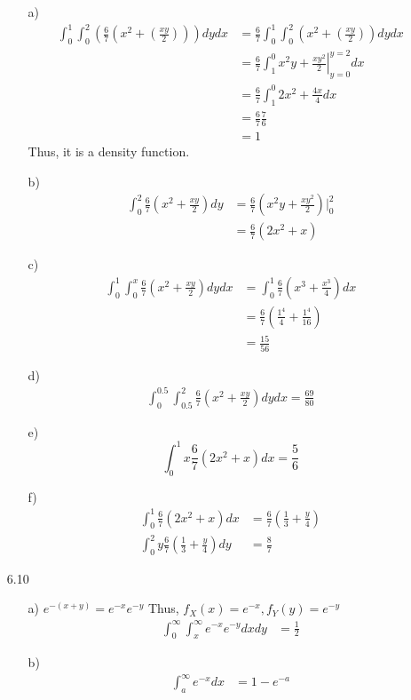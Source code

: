 \documentclass{article}
\begin{document}
\begin{itemize}
    \begin{itemize}
        \item [a)]
        \begin{align*}
            \int_{0}^{1}\int_{0}^{2}\left(\frac{6}{7}\left(x^2+\left(\frac{xy}{2}\right)\right)\right)dydx &=\frac{6}{7} \int_{0}^{1}\int_{0}^{2}\left(x^2+\left(\frac{xy}{2}\right)\right)dydx\\
            &=\frac{6}{7}\int_{1}^{0}\left.x^2y+\frac{xy^2}{2}\right|^{y=2}_{y=0}dx\\
            &=\frac{6}{7}\int_{1}^{0}2x^2+\frac{4x}{4}dx\\
            &=\frac{6}{7}\frac{7}{6}\\
            &=1
        \end{align*} Thus, it is a density function.
        \item [b)]
        \begin{align*}
            \int_{0}^{2}\frac{6}{7}\left(x^2+\frac{xy}{2}\right) dy&=\frac{6}{7}\left(x^2y+\frac{xy^2}{2}\right)|^{2}_{0}\\
            &=\frac{6}{7}(2x^2+x)
        \end{align*}
        \item [c)]
        \begin{align*}
            \int_{0}^{1}\int_{0}^{x}\frac{6}{7}\left(x^2+\frac{xy}{2}\right) dydx&=\int_{0}^{1}\frac{6}{7}(x^3+\frac{x^3}{4}) dx\\
            &=\frac{6}{7}\left(\frac{1^4}{4}+\frac{1^4}{16}\right)\\
            &=\frac{15}{56}
        \end{align*}
        \item [d)]
        \begin{align*}
            \int_{0}^{0.5}\int_{0.5}^{2}\frac{6}{7}\left(x^2+\frac{xy}{2}\right) dydx = \frac{69}{80}
        \end{align*}
        \item [e)]
        \[\int_{0}^{1}x\frac{6}{7}(2x^2+x) dx = \frac{5}{6}\]
        \item [f)]
        \begin{align*}
            \int_{0}^{1}\frac{6}{7}(2x^2+x) dx &= \frac{6}{7}(\frac{1}{3}+\frac{y}{4})\\
            \int_{0}^{2}y \frac{6}{7}(\frac{1}{3}+\frac{y}{4}) dy &= \frac{8}{7}
        \end{align*}
    \end{itemize}
    \item [6.10]
    \begin{itemize}
        \item [a)] \(e^{-(x+y)}=e^{-x}e^{-y}\) Thus, \(f_X(x)=e^{-x},f_Y(y)=e^{-y}\)
        \begin{align*}
            \int_{0}^{\infty}\int_{x}^{\infty}e^{-x}e^{-y} dx dy &=\frac{1}{2}
        \end{align*}
        \item [b)]
        \begin{align*}
            \int_{a}^{\infty} e^{-x} dx &=1-e^{-a}
        \end{align*}
    \end{itemize}
\end{itemize}
\end{document}
